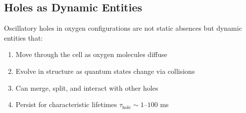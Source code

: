 \subsection{Holes as Dynamic Entities}

\begin{theorem}
\label{thm:oxygen_holes_dynamic}
Oscillatory holes in oxygen configurations are not static absences but dynamic entities that:
\begin{enumerate}
\item Move through the cell as oxygen molecules diffuse
\item Evolve in structure as quantum states change via collisions
\item Can merge, split, and interact with other holes
\item Persist for characteristic lifetimes $\tau_{\text{hole}} \sim 1$--$100$ ms
\end{enumerate}
\end{theorem}

